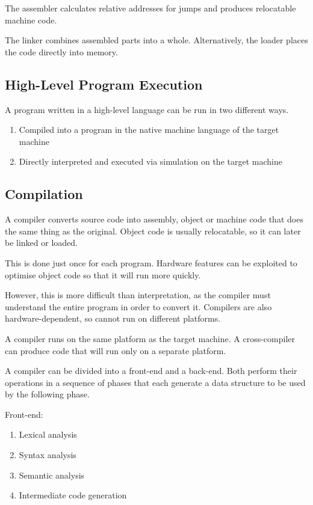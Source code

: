 The assembler calculates relative addresses for jumps and produces relocatable machine code.

The linker combines assembled parts into a whole.
Alternatively, the loader places the code directly into memory.

\subsection{High-Level Program Execution}

A program written in a high-level language can be run in two different ways.

\begin{enumerate}
  \item Compiled into a program in the native machine language of the target machine
  \item Directly interpreted and executed via simulation on the target machine
\end{enumerate}

\subsection{Compilation}

A compiler converts source code into assembly, object or machine code that does the same thing as the original.
Object code is usually relocatable, so it can later be linked or loaded.

This is done just once for each program.
Hardware features can be exploited to optimise object code so that it will run more quickly.

However, this is more difficult than interpretation, as the compiler must understand the entire program in order to convert it.
Compilers are also hardware-dependent, so cannot run on different platforms.

A compiler runs on the same platform as the target machine.
A cross-compiler can produce code that will run only on a separate platform.

A compiler can be divided into a front-end and a back-end.
Both perform their operations in a sequence of phases that each generate a data structure to be used by the following phase.

\clearpage

Front-end:
\begin{enumerate}
  \item Lexical analysis
  \item Syntax analysis
  \item Semantic analysis
  \item Intermediate code generation
\end{enumerate}

